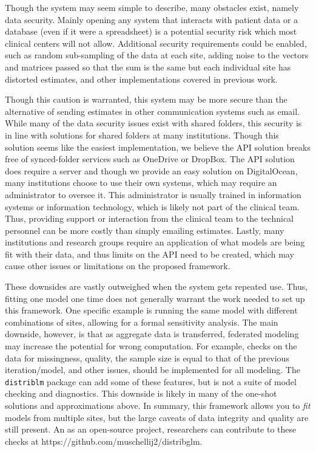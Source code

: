 \documentclass[]{elsarticle} %
\begin{document}
Though the system may seem simple to describe, many obstacles exist, namely data security. Mainly opening any system that interacts with patient data or a database (even if it were a spreadsheet) is a potential security risk which most clinical centers will not allow. Additional security requirements could be enabled, such as random sub-sampling of the data at each site, adding noise to the vectors and matrices passed so that the sum is the same but each individual site has distorted estimates, and other implementations covered in previous work.

Though this caution is warranted, this system may be more secure than the alternative of sending estimates in other communication systems such as email. While many of the data security issues exist with shared folders, this security is in line with solutions for shared folders at many institutions. Though this solution seems like the easiest implementation, we believe the API solution breaks free of synced-folder services such as OneDrive or DropBox. The API solution does require a server and though we provide an easy solution on DigitalOcean, many institutions choose to use their own systems, which may require an administrator to oversee it. This administrator is usually trained in information systems or information technology, which is likely not part of the clinical team. Thus, providing support or interaction from the clinical team to the technical personnel can be more costly than simply emailing estimates. Lastly, many institutions and research groups require an application of what models are being fit with their data, and thus limits on the API need to be created, which may cause other issues or limitations on the proposed framework.

These downsides are vastly outweighed when the system gets repeated use. Thus, fitting one model one time does not generally warrant the work needed to set up this framework. One specific example is running the same model with different combinations of sites, allowing for a formal sensitivity analysis. The main downside, however, is that as aggregate data is transferred, federated modeling may increase the potential for wrong computation. For example, checks on the data for missingness, quality, the sample size is equal to that of the previous iteration/model, and other issues, should be implemented for all modeling. The \texttt{distriblm} package can add some of these features, but is not a suite of model checking and diagnostics. This downside is likely in many of the one-shot solutions and approximations above. In summary, this framework allows you to \emph{fit} models from multiple sites, but the large caveats of data integrity and quality are still present. An as an open-source project, researchers can contribute to these checks at https://github.com/muschellij2/distribglm.
\end{document}
